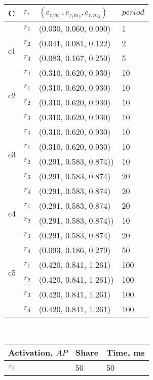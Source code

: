 \begin{center}
\small
\begin{minipage}{.5\textwidth}%
\centering
\begin{tabular}{@{}p{0.25cm}lll@{}}
\toprule
C& $r_i$ & $(e_{r_im_1}, e_{r_im_2}, e_{r_im_3})$ & $period$\\ \midrule
\multirow{4}{4em}{c1} 
&$r_1$ & (0.030, 0.060, 0.090) & 1\\
&$r_2$ & (0.041, 0.081, 0.122) & 2\\
&$r_3$ & (0.083, 0.167, 0.250)  & 5\\ 
&$r_4$ & (0.310, 0.620, 0.930) & 10 \\[0.3em]
\hline
\multirow{2}{4em}{c2} 
&$r_1$ & (0.310, 0.620, 0.930) & 10\\
&$r_2$ & (0.310, 0.620, 0.930) & 10\\
&$r_3$ & (0.310, 0.620, 0.930)  & 10\\ 
&$r_4$ & (0.310, 0.620, 0.930) & 10 \\[0.3em]
\hline
\multirow{2}{4em}{c3} 
&$r_1$ & (0.310, 0.620, 0.930) & 10\\
&$r_2$ & (0.291, 0.583, 0.874)) & 10\\
&$r_3$ & (0.291, 0.583, 0.874)  & 20\\ 
&$r_4$ & (0.291, 0.583, 0.874) & 20 \\[0.3em]
\hline
\multirow{2}{4em}{c4} 
&$r_1$ & (0.291, 0.583, 0.874) & 20\\
&$r_2$ & (0.291, 0.583, 0.874)) & 10\\
&$r_3$ & (0.291, 0.583, 0.874)  & 20\\ 
&$r_4$ & (0.093, 0.186, 0.279) & 50 \\[0.3em]
\hline
\multirow{2}{4em}{c5} 
&$r_1$ & (0.420, 0.841, 1.261) & 100\\
&$r_2$ & (0.420, 0.841, 1.261)) & 100\\
&$r_3$ & (0.420, 0.841, 1.261)  & 100\\ 
&$r_4$ & (0.420, 0.841, 1.261) & 100 \\[0.3em]
\bottomrule
\end{tabular}
\label{tbl_comps_config}
\end{minipage}~
\begin{minipage}{.45\textwidth}
\begin{center}
    \begin{tabular}{@{}lll@{}}
    \toprule
    Activation, $AP$ & Share & Time, ms \\ \midrule
    $\tau_1$ & 50  & 50\\

\end{tabular}
\end{center}
\end{minipage}
\end{center}
